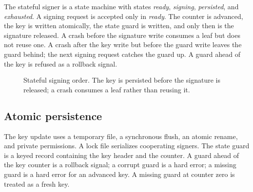 \documentclass[11pt,a4paper]{article}
\theoremstyle{remark}
\begin{document}
The stateful signer is a state machine with states \emph{ready},
\emph{signing}, \emph{persisted}, and \emph{exhausted}. A signing request is
accepted only in \emph{ready}. The counter is advanced, the key is written
atomically, the state guard is written, and only then is the signature released.
A crash before the signature write consumes a leaf but does not reuse one. A
crash after the key write but before the guard write leaves the guard behind;
the next signing request catches the guard up. A guard ahead of the key is
refused as a rollback signal.

\begin{figure}[ht]
\centering
{}
\caption{Stateful signing order. The key is persisted before the signature is
released; a crash consumes a leaf rather than reusing it.}
\label{fig:state}
\end{figure}

\subsection{Atomic persistence}

The key update uses a temporary file, a synchronous flush, an atomic rename, and
private permissions. A lock file serializes cooperating signers. The state guard
is a keyed record containing the key header and the counter. A guard ahead of the
key counter is a rollback signal; a corrupt guard is a hard error; a missing
guard is a hard error for an advanced key. A missing guard at counter zero is
treated as a fresh key.
\end{document}
